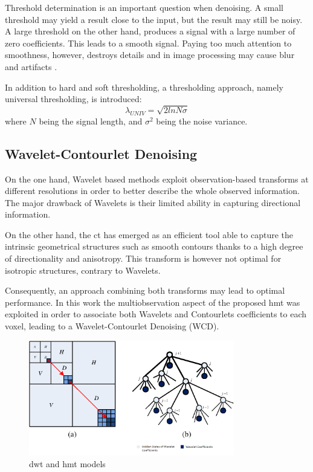 Threshold determination is an important question when denoising. A small threshold
may yield a result close to the input, but the
result may still be noisy. A large threshold on the other hand, produces a signal with a large number
of zero coefficients. This leads to a smooth signal.
Paying too much attention to smoothness, however,
destroys details and in image processing may cause
blur and artifacts \cite{rangarajan2002image}.

In addition to hard and soft thresholding, a thresholding approach, namely universal thresholding, is introduced:
\begin{equation}
\lambda_{UNIV}=\sqrt{2lnN\sigma}
\end{equation}
where $N$ being the signal length, and $\sigma^2$ being the noise variance.


\subsection{Wavelet-Contourlet Denoising}

On the one hand, Wavelet based methods exploit observation-based transforms at different resolutions in order to better describe the whole observed information. The major drawback of Wavelets is their limited ability in
capturing directional information. 

On the other hand, the \gls{ct} has emerged as an efficient tool able
to capture the intrinsic geometrical structures such as smooth
contours thanks to a high degree of directionality and
anisotropy. This transform is however not optimal for isotropic
structures, contrary to Wavelets.

Consequently, an approach combining both transforms may
lead to optimal performance. In this work the multiobservation
aspect of the proposed \gls{hmt} was exploited in
order to associate both Wavelets and Contourlets coefficients
to each voxel, leading to a Wavelet-Contourlet
Denoising (WCD).


\begin{figure}[h]
	\centering
	\includegraphics[width=0.8\textwidth]{fig/wavelets_hmt}
	\caption{\glsdesc{dwt} and \glsdesc{hmt} models}
	\label{fig:wavelets_hmt}
\end{figure}


